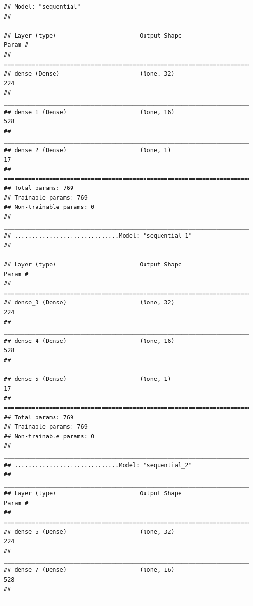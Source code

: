 \documentclass[
]{article}
\begin{document}
\begin{verbatim}
## Model: "sequential"
## ________________________________________________________________________________
## Layer (type)                        Output Shape                    Param #     
## ================================================================================
## dense (Dense)                       (None, 32)                      224         
## ________________________________________________________________________________
## dense_1 (Dense)                     (None, 16)                      528         
## ________________________________________________________________________________
## dense_2 (Dense)                     (None, 1)                       17          
## ================================================================================
## Total params: 769
## Trainable params: 769
## Non-trainable params: 0
## ________________________________________________________________________________
## ..............................Model: "sequential_1"
## ________________________________________________________________________________
## Layer (type)                        Output Shape                    Param #     
## ================================================================================
## dense_3 (Dense)                     (None, 32)                      224         
## ________________________________________________________________________________
## dense_4 (Dense)                     (None, 16)                      528         
## ________________________________________________________________________________
## dense_5 (Dense)                     (None, 1)                       17          
## ================================================================================
## Total params: 769
## Trainable params: 769
## Non-trainable params: 0
## ________________________________________________________________________________
## ..............................Model: "sequential_2"
## ________________________________________________________________________________
## Layer (type)                        Output Shape                    Param #     
## ================================================================================
## dense_6 (Dense)                     (None, 32)                      224         
## ________________________________________________________________________________
## dense_7 (Dense)                     (None, 16)                      528         
## ________________________________________________________________________________

\end{verbatim}
\end{document}

